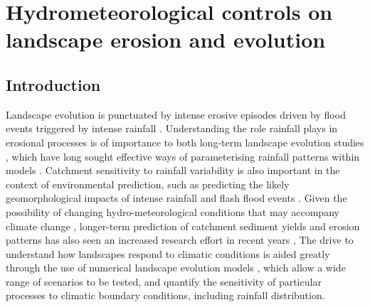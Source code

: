 \chapter{Hydrometeorological controls on landscape erosion and evolution}
\label{chapter_hydrogeomorph}

\section{Introduction}

Landscape evolution is punctuated by intense erosive episodes driven by flood events triggered by intense rainfall \citep{Wolman1960,newson1980geomorphological,Costa1995}. Understanding the role rainfall plays in erosional processes is of importance to both long-term landscape evolution studies \citep[e.g.][]{rinaldo1995geomorphological,tucker1997drainage,Tucker2000}, which have long sought effective ways of parameterising rainfall patterns within models \citep[e.g][]{Eagleson1978}.  Catchment sensitivity to rainfall variability is also important in the context of environmental prediction, such as predicting the likely geomorphological impacts of intense rainfall and flash flood events \citep[e.g.][]{lane2007interactions,deluis2010rainfall,milan2012geomorphic}. Given the possibility of changing hydro-meteorological conditions that may accompany climate change \citep{Kendon2014}, longer-term prediction of catchment sediment yields and erosion patterns has also seen an increased research effort in recent years \citep{coulthard2000modelling,Coulthard2012,hancock2017sediment}, The drive to understand how landscapes respond to climatic conditions is aided greatly through the use of numerical landscape evolution models \citep{Tucker2010}, which allow a wide range of scenarios to be tested, and quantify the sensitivity of particular processes to climatic boundary conditions, including rainfall distribution.

